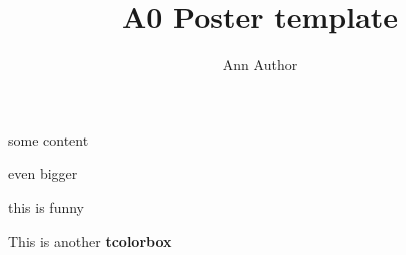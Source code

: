 \documentclass{rsuqposterA0}
\author{Ann Author}
\title{A0 Poster template}
\begin{document}
{	\VERYHuge
some content
}

\colorbox{rsuqlightblue}{
	\begin{minipage}[t][13cm][c]{20cm}
		even bigger
	\end{minipage}
}\hfill
\colorbox{ETH1}{
	\parbox[t][13cm][c]{35cm}{
		this is funny
	}
}
\begin{tcolorbox}[colback=white!5!white,colframe=blue!75!black,title=My nice heading]
\parbox{.3\textwidth}{	This is another \textbf{tcolorbox}}
\end{tcolorbox}


\rsuqfooter{}
\end{document}
